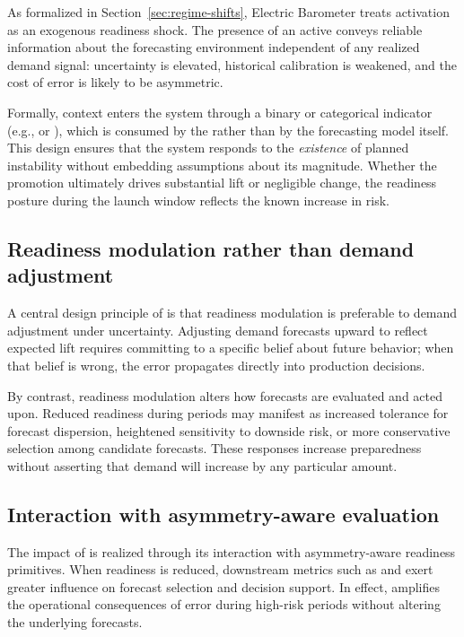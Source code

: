 As formalized in Section~\ref{sec:regime-shifts}, Electric Barometer treats \LTO{} activation as an
exogenous readiness shock. The presence of an active \LTO{} conveys reliable information about the
forecasting environment independent of any realized demand signal: uncertainty is elevated,
historical calibration is weakened, and the cost of error is likely to be asymmetric.

Formally, \LTO{} context enters the system through a binary or categorical indicator (e.g.,
\ltoOn{} or \ltoPhase{}), which is consumed by the \RAL{} rather than by the forecasting model
itself. This design ensures that the system responds to the \emph{existence} of planned instability
without embedding assumptions about its magnitude. Whether the promotion ultimately drives
substantial lift or negligible change, the readiness posture during the launch window reflects the
known increase in risk.

\subsection{Readiness modulation rather than demand adjustment}
\label{subsec:readiness-modulation}

A central design principle of \RAL{} is that readiness modulation is preferable to demand
adjustment under uncertainty. Adjusting demand forecasts upward to reflect expected \LTO{} lift
requires committing to a specific belief about future behavior; when that belief is wrong, the error
propagates directly into production decisions.

By contrast, readiness modulation alters how forecasts are evaluated and acted upon. Reduced
readiness during \LTO{} periods may manifest as increased tolerance for forecast dispersion,
heightened sensitivity to downside risk, or more conservative selection among candidate forecasts.
These responses increase preparedness without asserting that demand will increase by any
particular amount.

\subsection{Interaction with asymmetry-aware evaluation}
\label{subsec:ral-asymmetry}

The impact of \RAL{} is realized through its interaction with asymmetry-aware readiness primitives.
When readiness is reduced, downstream metrics such as \CWSL{} and \NSL{} exert greater influence
on forecast selection and decision support. In effect, \RAL{} amplifies the operational consequences
of error during high-risk periods without altering the underlying forecasts.

